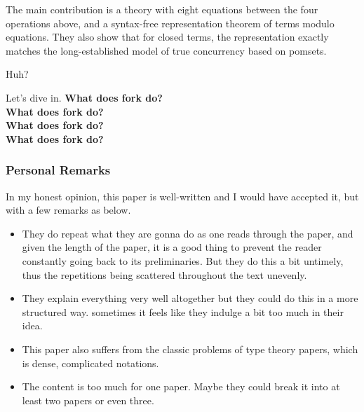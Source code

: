 \documentclass[12pt]{extarticle}
\begin{document}
The main contribution is a theory with eight equations between the four operations above, and a syntax-free representation theorem of terms modulo equations. They also show that for closed terms, the representation exactly matches the long-established model of true concurrency based on pomsets.

Huh?

Let's dive in.\newline
\textbf{What does fork do?}\\
\textbf{What does fork do?}\\
\textbf{What does fork do?}\\
\textbf{What does fork do?}\\

\subsubsection*{Personal Remarks}
In my honest opinion, this paper is well-written and I would have accepted it, but with a few remarks as below.
\begin{itemize}
    \item They do repeat what they are gonna do as one reads through the paper, and given the length of the paper, it is a good thing to prevent the reader constantly going back to its preliminaries. But they do this a bit untimely, thus the repetitions being scattered throughout the text unevenly.
    \item They explain everything very well altogether but they could do this in a more structured way. sometimes it feels like they indulge a bit too much in their idea.
    \item This paper also suffers from the classic problems of type theory papers, which is dense, complicated notations.
    \item The content is too much for one paper. Maybe they could break it into at least two papers or even three.
\end{itemize}



\end{document}
